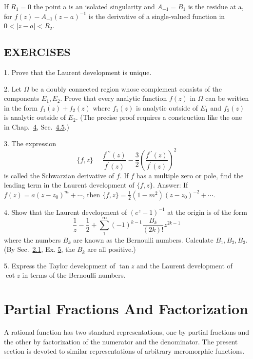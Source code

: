 If $R_{1}=0$ the point a is an isolated singularity and $A_{-1}=B_{1}$ is the residue at a, for $f(z)-A_{-1}(z-a)^{-1}$ is the derivative of a single-valued function in $0<|z-a|<R_{2}$.

\subsection*{EXERCISES}
1. Prove that the Laurent development is unique.

2. Let $\Omega$ be a doubly connected region whose complement consists of the components $E_1, E_2$. Prove that every analytic function $f(z)$ in $\Omega$ can be written in the form $f_1(z) + f_2(z)$ where $f_1(z)$ is analytic outside of $E_1$ and $f_2(z)$ is analytic outside of $E_2$. (The precise proof requires a construction like the one in Chap.~\hyperref[chap:4]{4}, Sec.~\hyperref[sec:4.4.5]{4.5}.)

3. The expression
\begin{equation*}
\{f, z \} = \frac {f ^ {\prime \prime \prime} (z)}{f ^ {\prime} (z)} - \frac {3}{2} \left(\frac {f ^ {\prime \prime} (z)}{f ^ {\prime} (z)}\right) ^ {2}
\end{equation*}
is called the Schwarzian derivative of $f$. If $f$ has a multiple zero or pole, find the leading term in the Laurent development of $\{f, z\}$. Answer: If $f(z) = a(z - z_0)^m + \cdots$, then $\{f, z\} = \frac{1}{2}(1 - m^2)(z - z_0)^{-2} + \cdots$.

4. Show that the Laurent development of $(e^{z}-1)^{-1}$ at the origin is of the form
\begin{equation*}
\frac {1}{z} - \frac {1}{2} + \sum_ {1} ^ {\infty} (- 1) ^ {k - 1} \frac {B _ {k}}{(2 k) !} z ^ {2 k - 1}
\end{equation*}
where the numbers $B_{k}$ are known as the Bernoulli numbers. Calculate $B_{1}, B_{2}, B_{3}$. (By Sec.~\hyperref[sec:5.2.1]{2.1}, Ex. \hyperref[exercise:5.2.1.4.5]{5}, the $B_{k}$ are all positive.)

5. Express the Taylor development of $\tan z$ and the Laurent development of $\cot z$ in terms of the Bernoulli numbers.


\setcounter{section}{1}\section{Partial Fractions And Factorization}\label{sec:5.2}
A rational function has two standard representations, one by partial fractions and the other by factorization of the numerator and the denominator. The present section is devoted to similar representations of arbitrary meromorphic functions.

